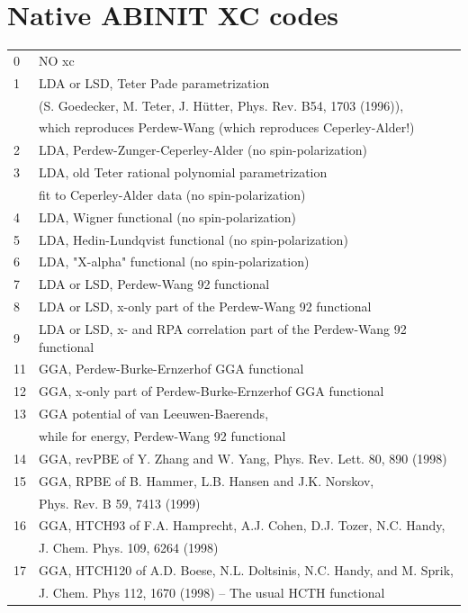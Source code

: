 \documentclass[a4paper,11pt]{report}
\begin{document}
\section{Native ABINIT XC codes}
\begin{longtable}{ll}
0  & NO xc\\
1  & LDA or LSD, Teter Pade parametrization\\
   & (S. Goedecker, M. Teter, J. H\"utter, Phys. Rev. B54, 1703 (1996)),\\
   & which reproduces Perdew-Wang (which reproduces Ceperley-Alder!)\\
2  & LDA, Perdew-Zunger-Ceperley-Alder (no spin-polarization)\\
3  & LDA, old Teter rational polynomial parametrization\\
   & fit to Ceperley-Alder data (no spin-polarization)\\
4  & LDA, Wigner functional (no spin-polarization)\\
5  & LDA, Hedin-Lundqvist functional (no spin-polarization)\\
6  & LDA, "X-alpha" functional (no spin-polarization)\\
7  & LDA or LSD, Perdew-Wang 92 functional\\
8  & LDA or LSD, x-only part of the Perdew-Wang 92 functional\\
9  & LDA or LSD, x- and RPA correlation part of the Perdew-Wang 92 functional\\
11 & GGA, Perdew-Burke-Ernzerhof GGA functional\\
12 & GGA, x-only part of Perdew-Burke-Ernzerhof GGA functional\\
13 & GGA potential of van Leeuwen-Baerends,\\
   & while for energy, Perdew-Wang 92 functional\\
14 & GGA, revPBE of Y. Zhang and W. Yang, Phys. Rev. Lett. 80, 890 (1998)\\
15 & GGA, RPBE of B. Hammer, L.B. Hansen and J.K. Norskov,\\
   & Phys. Rev. B 59, 7413 (1999)\\
16 & GGA, HTCH93 of F.A. Hamprecht, A.J. Cohen, D.J. Tozer, N.C. Handy,\\
   & J. Chem. Phys. 109, 6264 (1998)\\
17 & GGA, HTCH120 of A.D. Boese, N.L. Doltsinis, N.C. Handy, and M. Sprik,\\
   & J. Chem. Phys 112, 1670 (1998) -- The usual HCTH functional\\

\end{longtable}
\end{document}
